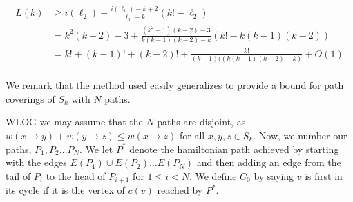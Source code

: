 \documentclass{article}
\newcommand{\hide}[1]{}
\newcommand{\dc}[1]{}%
\begin{document}
\begin{align*}
    L(k) &\geq i(\ell_2)+\frac{i(\ell_1)-k+2}{\ell_1-k}(k!-\ell_2)\\
    &= k^2(k-2) -3 +\frac{(k^2-1)(k-2)-3}{k(k-1)(k-2)-k}(k!-k(k-1)(k-2))\\
    &= k! + (k-1)! +(k-2)! + \frac{k!}{(k-1)((k(k-1)(k-2)-k)} + O(1)\\
\end{align*}

\hide{*The reason for this is that our bound pretends that in the interval $a_t +k < \ell \leq a_t + k(k-1)(k-2)$, $a_t = t(k(k-1)(k-2)-k)+k$, that we have a fixed initial cost $j(t)$, followed by a path $p_f$ of weight $i(\ell-a_t)$. Here, we find that letting $p_f$ be a 3-cycle is again optimal, which corresponds to letting $\ell$ take the largest value in the interval. The reason for why a 3-cycle is optimal here is roughly that it optimizes $w(p)/|p|$ for $k<|p|\leq k(k-1)(k-2)$, and then by properties of farey addition, it is the best way to optimize $\frac{j(t)+w(p)}{a_t+|p|}$.\dc{ Literally none of this reasoning makes sense given the machinery and terminology you have established so far. What is $j$? What is a 3-cycle? What is the meaning of ``optimal'' (or it is optimal compared to what)? What do you mean ``roughly''? What is farey (probably should be capitalized) addition? Why are we optimizing that particular quantity?}}

We remark that the method used easily generalizes to provide a bound for path coverings of $S_k$ with $N$ paths. 

WLOG we may assume that the $N$ paths are disjoint, as $w(x\to y)+w(y\to z) \le w(x \to z)$ for all $x,y,z \in S_k$. Now, we number our paths, $P_1,P_2\dots P_N$. We let $P^*$ denote the hamiltonian path achieved by starting with the edges $E(P_1) \cup E(P_2) \dots E(P_N)$ and then adding an edge from the tail of $P_i$ to the head of $P_{i+1}$ for $1\le i< N$. We define $C_0$ by saying $v$ is first in its cycle if it is the vertex of $c(v)$ reached by $P^*$.


\hide{
$\dagger$ We outline how we reached these conclusions. First, we by considered optimizing the intervals $t(k(k-1)(k-2)-k)+k < \ell \leq (t+1)(k(k-1)(k-2)-k)+k$, $t \geq 1$, according to our lower bound of $i$, and concluded that taking $\ell = (t+1)(k(k-1)(k-2)-k)+k$ was best. 

We then simply considered the interval up to $k(k-1)(k-2)$, finding that taking $\ell = k(k-1)(k-2)$ was best. Comparing to the optimal $\ell$'s in across intervals, we concluded that they all gave the same value. 

Finally, since our bound is tight along the interval up to $k(k-1)(k-2)$, we are able to remark equality for these two bounds. (meaning with the current reductions, this bound is tight, and cannot be improved)}
\end{document}
